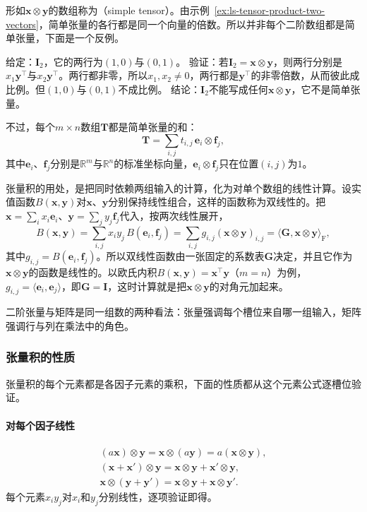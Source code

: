 形如$\bm x\otimes\bm y$的数组称为（simple tensor）。由示例~\ref{ex:ls-tensor-product-two-vectors}，简单张量的各行都是同一个向量的倍数。所以并非每个二阶数组都是简单张量，下面是一个反例。
\begin{example}[反例：单位矩阵不是简单张量]
\label{ex:ls-identity-not-simple}
给定：$\bm I_2$，它的两行为$(1,0)$与$(0,1)$。
验证：若$\bm I_2=\bm x\otimes\bm y$，则两行分别是$x_1\bm y^\top$与$x_2\bm y^\top$。两行都非零，所以$x_1,x_2\neq0$，两行都是$\bm y^\top$的非零倍数，从而彼此成比例。但$(1,0)$与$(0,1)$不成比例。
结论：$\bm I_2$不能写成任何$\bm x\otimes\bm y$，它不是简单张量。
\end{example}
不过，每个$m\times n$数组$\bm T$都是简单张量的和：
\[
 \bm T=\sum_{i,j}t_{i,j}\,\bm e_i\otimes\bm f_j,
\]
其中$\bm e_i$、$\bm f_j$分别是$\mathbb R^m$与$\mathbb R^n$的标准坐标向量，$\bm e_i\otimes\bm f_j$只在位置$(i,j)$为$1$。

张量积的用处，是把同时依赖两组输入的计算，化为对单个数组的线性计算。设实值函数$B(\bm x,\bm y)$对$\bm x$、$\bm y$分别保持线性组合，这样的函数称为双线性的。把$\bm x=\sum_ix_i\bm e_i$、$\bm y=\sum_jy_j\bm f_j$代入，按两次线性展开，
\[
 B(\bm x,\bm y)=\sum_{i,j}x_iy_j\,B(\bm e_i,\bm f_j)=\sum_{i,j}g_{i,j}(\bm x\otimes\bm y)_{i,j}
 =\langle\bm G,\bm x\otimes\bm y\rangle_{\mathrm F},
\]
其中$g_{i,j}=B(\bm e_i,\bm f_j)$。所以双线性函数由一张固定的系数表$\bm G$决定，并且它作为$\bm x\otimes\bm y$的函数是线性的。以欧氏内积$B(\bm x,\bm y)=\bm x^\top\bm y$（$m=n$）为例，$g_{i,j}=\langle\bm e_i,\bm e_j\rangle$，即$\bm G=\bm I$，这时计算就是把$\bm x\otimes\bm y$的对角元加起来。

二阶张量与矩阵是同一组数的两种看法：张量强调每个槽位来自哪一组输入，矩阵强调行与列在乘法中的角色。

\subsubsection{张量积的性质}
\label{sec:ls-tensor-product-properties}

张量积的每个元素都是各因子元素的乘积，下面的性质都从这个元素公式逐槽位验证。

\paragraph{对每个因子线性}
\[
 \begin{gathered}
(a\bm x)\otimes\bm y=\bm x\otimes(a\bm y)=a(\bm x\otimes\bm y),\\
(\bm x+\bm x')\otimes\bm y=\bm x\otimes\bm y+\bm x'\otimes\bm y,\\
\bm x\otimes(\bm y+\bm y')=\bm x\otimes\bm y+\bm x\otimes\bm y'.
 \end{gathered}
\]
每个元素$x_iy_j$对$x_i$和$y_j$分别线性，逐项验证即得。

